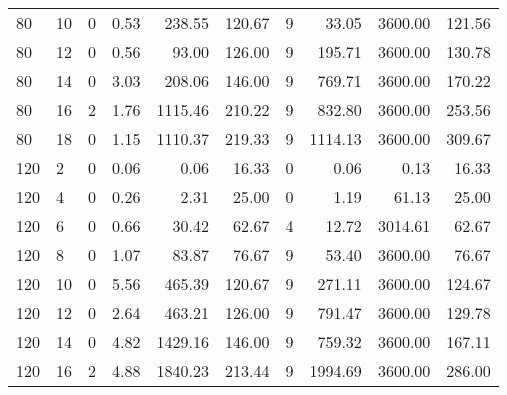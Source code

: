 \begin{appendices}
\begin{table*}[h]
\begin{center}
\begin{tabular} {l l | r r r r | r r r r}
 80 & 10                                 &  0           &  0.53         &  238.55    &  120.67          &  9            &   33.05      & 3600.00     &  121.56      \\ 
 80 & 12                                 &  0           &  0.56         &  93.00     &  126.00          &  9            &   195.71     & 3600.00     &  130.78      \\ 
 80 & 14                                 &  0           &  3.03         &  208.06    &  146.00          &  9            &   769.71     & 3600.00     &  170.22      \\ 
 80 & 16                                 &  2           &  1.76         &  1115.46   &  210.22          &  9            &   832.80     & 3600.00     &  253.56      \\ 
 80 & 18                                 &  0           &  1.15         &  1110.37   &  219.33          &  9            &   1114.13    & 3600.00     &  309.67      \\ 
 120 & 2                                 &  0           &  0.06         &  0.06      &  16.33           &  0            &   0.06       & 0.13        &  16.33       \\ 
 120 & 4                                 &  0           &  0.26         &  2.31      &  25.00           &  0            &   1.19       & 61.13       &  25.00       \\ 
 120 & 6                                 &  0           &  0.66         &  30.42     &  62.67           &  4            &   12.72      & 3014.61     &  62.67       \\ 
 120 & 8                                 &  0           &  1.07         &  83.87     &  76.67           &  9            &   53.40      & 3600.00     &  76.67       \\ 
 120 & 10                                &  0           &  5.56         &  465.39    &  120.67          &  9            &   271.11     & 3600.00     &  124.67      \\ 
 120 & 12                                &  0           &  2.64         &  463.21    &  126.00          &  9            &   791.47     & 3600.00     &  129.78      \\ 
 120 & 14                                &  0           &  4.82         &  1429.16   &  146.00          &  9            &   759.32     & 3600.00     &  167.11      \\ 
 120 & 16                                &  2           &  4.88         &  1840.23   &  213.44          &  9            &   1994.69    & 3600.00     &  286.00      \\ 

\end{tabular}
\end{center}
\end{table*}
\end{appendices}
